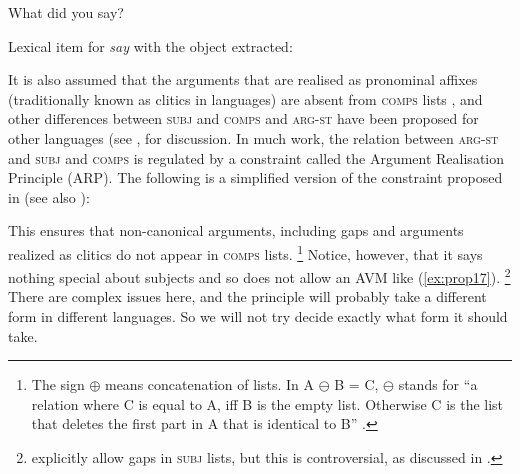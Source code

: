 \documentclass[output=paper
	        ,collection
	        ,collectionchapter
 	        ,biblatex
                ,babelshorthands
                ,newtxmath
                ,draftmode
                ,colorlinks, citecolor=brown
]{langscibook}
\begin{document}
\ea\label{ex:prop18}
What did you say?

\ex\label{ex:prop19}
Lexical item for \emph{say} with the object extracted:\\
\z

It is also assumed that the arguments that are realised as pronominal affixes (traditionally known as clitics in  languages) are absent from \textsc{comps} lists \citep{MS97a-u,monachesi05}\addpages, and other differences between \textsc{subj} and \textsc{comps} and \textsc{arg-st} have been proposed for other languages (see \citealt{MS99a}, \addpages for discussion. In much work, the relation between \textsc{arg-st} and \textsc{subj} and \textsc{comps} is regulated by a constraint called the Argument Realisation Principle (ARP).\label{page-arguent-realizatin-principle} The following is a simplified version of the constraint proposed in \citet[171]{GSag2000a-u} (see also \citealt[12]{BMS2001a}):

\ea\label{ex:prop20}
 \impl
{}
\z

This ensures that non-canonical arguments, including gaps and arguments realized as clitics do not appear in \textsc{comps} lists.%
%
\footnote{The sign $\oplus$ means concatenation of lists. In A $\ominus$ B = C, $\ominus$ stands for ``a relation where C is equal to A, iff B is the empty list. Otherwise C is the list that deletes the first part in A that is identical to B'' \citep[]{Mueller2000h}.}
%
Notice, however, that it says nothing special about subjects and so does not allow an AVM like (\ref{ex:prop17}).%
%
\footnote{\citet[177--183]{GSag2000a-u} explicitly allow gaps in \textsc{subj} lists, but this is controversial, as discussed in \inlineaddpages.}
%
There are complex issues here, and the principle will probably take a different form in different languages. So we will not try decide exactly what form it should take.
\end{document}
